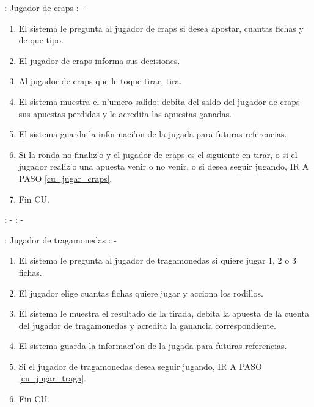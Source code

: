 : Jugador de craps \newline
\indent{}: -

\begin{enumerate}
\item El sistema le pregunta al jugador de craps si desea apostar, cuantas fichas y de que tipo. \label{cu_jugar_craps}
\item El jugador de craps informa sus decisiones.
\item Al jugador de craps que le toque tirar, tira.
\item El sistema muestra el n'umero salido; debita del saldo del jugador de craps sus apuestas perdidas y le acredita las apuestas ganadas.
\item El sistema guarda la informaci'on de la jugada para futuras referencias.
\item Si la ronda no finaliz'o y el jugador de craps es el siguiente en tirar, o si el jugador realiz'o una apuesta venir o no venir, o si desea seguir jugando, IR A PASO \ref{cu_jugar_craps}.
\item Fin CU.
\end{enumerate}



: - \newline
\indent{}: -

: Jugador de tragamonedas \newline
\indent{}: -

\begin{enumerate}
\item El sistema le pregunta al jugador de tragamonedas si quiere jugar 1, 2 o 3 fichas. \label{cu_jugar_traga}
\item El jugador elige cuantas fichas quiere jugar y acciona los rodillos.
\item El sistema le muestra el resultado de la tirada, debita la apuesta de la cuenta del jugador de tragamonedas y acredita la ganancia correspondiente.
\item El sistema guarda la informaci'on de la jugada para futuras referencias.
\item Si el jugador de tragamonedas desea seguir jugando, IR A PASO \ref{cu_jugar_traga}.
\item Fin CU.
\end{enumerate}




